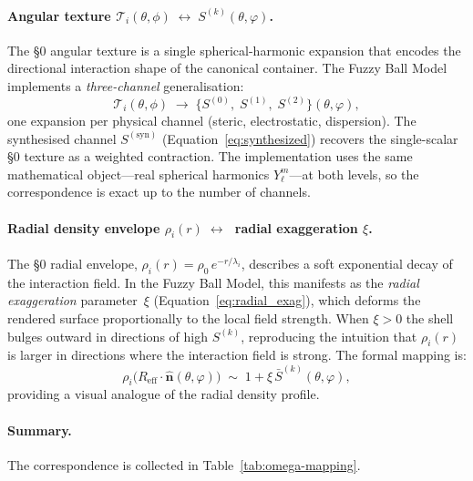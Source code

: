 \documentclass[12pt, a4paper, oneside]{article}
\newcommand{\nhat}{\hat{\bm{n}}}
\begin{document}
\paragraph{Angular texture $\mathcal{T}_i(\theta,\phi)
  \;\longleftrightarrow\; S^{(k)}(\theta,\varphi)$.}
The §0 angular texture is a single spherical-harmonic expansion that
encodes the directional interaction shape of the canonical container.
The Fuzzy Ball Model implements a \emph{three-channel} generalisation:
%
\begin{equation}
  \mathcal{T}_i(\theta,\phi) \;\longrightarrow\;
  \bigl\{
    S^{(0)},\; S^{(1)},\; S^{(2)}
  \bigr\}(\theta,\varphi),
  \label{eq:texture-link}
\end{equation}
%
one expansion per physical channel (steric, electrostatic, dispersion).
The synthesised channel $S^{(\text{syn})}$ (Equation~\ref{eq:synthesized})
recovers the single-scalar §0 texture as a weighted contraction.
The implementation uses the same mathematical object---real spherical
harmonics $Y_\ell^m$---at both levels, so the correspondence is
exact up to the number of channels.

\paragraph{Radial density envelope
  $\rho_i(r) \;\longleftrightarrow\;$ radial exaggeration $\xi$.}
The §0 radial envelope,
\(\rho_i(r) = \rho_0\,e^{-r/\lambda_i}\),
describes a soft exponential decay of the interaction field.
In the Fuzzy Ball Model, this manifests as the \emph{radial
exaggeration} parameter~$\xi$
(Equation~\ref{eq:radial_exag}), which deforms the rendered surface
proportionally to the local field strength.  When $\xi > 0$ the
shell bulges outward in directions of high $S^{(k)}$, reproducing
the intuition that $\rho_i(r)$ is larger in directions where the
interaction field is strong.  The formal mapping is:
\begin{equation}
  \rho_i\!\bigl(R_{\text{eff}} \cdot \nhat(\theta,\varphi)\bigr)
  \;\sim\;
  1 + \xi \, \bar{S}^{(k)}(\theta,\varphi),
  \label{eq:density-link}
\end{equation}
providing a visual analogue of the radial density profile.

\paragraph{Summary.}
The correspondence is collected in Table~\ref{tab:omega-mapping}.
\end{document}
